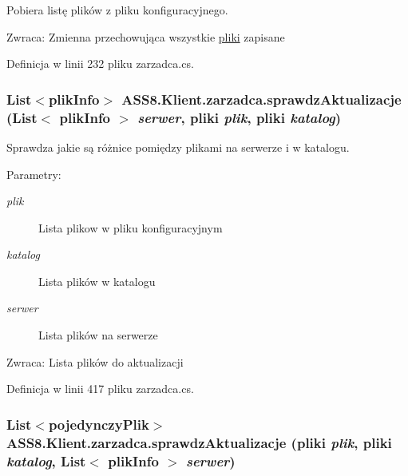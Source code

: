 Pobiera listę plików z pliku konfiguracyjnego. 

\begin{Desc}
\item[Zwraca:]Zmienna przechowująca wszystkie \hyperlink{a00017}{pliki} zapisane\end{Desc}


Definicja w linii 232 pliku zarzadca.cs.\hypertarget{a00037_605e903992f33680e874e6685760786a}{
\subsubsection[{sprawdzAktualizacje}]{\setlength{\rightskip}{0pt plus 5cm}List$<${\bf plikInfo}$>$ ASS8.Klient.zarzadca.sprawdzAktualizacje (List$<$ {\bf plikInfo} $>$ {\em serwer}, \/  {\bf pliki} {\em plik}, \/  {\bf pliki} {\em katalog})}}
\label{d1/dc6/a00037_605e903992f33680e874e6685760786a}


Sprawdza jakie są różnice pomiędzy plikami na serwerze i w katalogu. 

\begin{Desc}
\item[Parametry:]
\begin{description}
\item[{\em plik}]Lista plikow w pliku konfiguracyjnym\item[{\em katalog}]Lista plików w katalogu\item[{\em serwer}]Lista plików na serwerze\end{description}
\end{Desc}
\begin{Desc}
\item[Zwraca:]Lista plików do aktualizacji\end{Desc}


Definicja w linii 417 pliku zarzadca.cs.\hypertarget{a00037_929f999868b8425b4b6ae6a835187e22}{
\subsubsection[{sprawdzAktualizacje}]{\setlength{\rightskip}{0pt plus 5cm}List$<${\bf pojedynczyPlik}$>$ ASS8.Klient.zarzadca.sprawdzAktualizacje ({\bf pliki} {\em plik}, \/  {\bf pliki} {\em katalog}, \/  List$<$ {\bf plikInfo} $>$ {\em serwer})}}
\label{d1/dc6/a00037_929f999868b8425b4b6ae6a835187e22}


